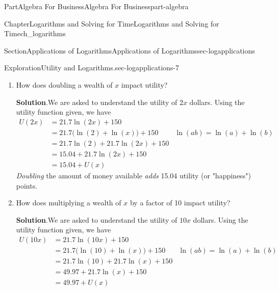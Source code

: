 \documentclass[oneside,10pt,]{tufte-book}
\newcommand{\blocktitlefont}{\relax}
\numberwithin{equation}{chapter}
\newcommand{\amp}{&}
\begin{document}
\begin{partptx}{Part}{Algebra For Business}{}{Algebra For Business}{}{}{part-algebra}
\begin{chapterptx}{Chapter}{Logarithms and Solving for Time}{}{Logarithms and Solving for Time}{}{}{ch_logarithms}
\begin{sectionptx}{Section}{Applications of Logarithms}{}{Applications of Logarithms}{}{}{sec-logapplications}
\begin{exploration}{Exploration}{Utility and Logarithms.}{sec-logapplications-7}
\begin{enumerate}[font=\bfseries,label=(\alph*),ref=\alph*]
\par
Finally, consider the values above \textdollar{}1000.  Note that increasing the balance by a factor of 10 \emph{approximately} increases their happiness by 50 utility points. Often, this is because the individual will start with a list of very clear and very productive uses of the money.  As those clear producive uses are taken care of, the individual needs to look for less clear or less productive uses for their money.  Thus, each dollar does not have the same value to the individual!%
\par
Of course, this is an overly simplified example.  In fact, utility functions are much more complex.  But even these more complex functions will share many of the above properties with our logarithmic utility.%
\item{}How does doubling a wealth of \textdollar{}\(x\) impact utility?%
\par\smallskip%
\noindent\textbf{\blocktitlefont Solution}.\hypertarget{sec-logapplications-7-4-2}{}\quad{}We are asked to understand the utility of \textdollar{}\(2x\) dollars.  Using the utility function given, we have%
\begin{align*}
U(2x) \amp = 21.7\ln(2x) + 150 \amp \\
\amp = 21.7\Big(\ln(2) + \ln(x) \Big) + 150 \amp \ln(ab)=\ln(a)+\ln(b) \\
\amp = 21.7\ln(2) + 21.7\ln(2x) + 150 \amp \\
\amp = 15.04 + 21.7\ln(2x) + 150 \amp \\
\amp = 15.04 + U(x) \amp 
\end{align*}
\emph{Doubling} the amount of money available \emph{adds} 15.04 utility (or "happiness") points.%
\item{}How does multiplying a wealth of \textdollar{}\(x\) by a factor of 10 impact utility?%
\par\smallskip%
\noindent\textbf{\blocktitlefont Solution}.\hypertarget{sec-logapplications-7-5-2}{}\quad{}We are asked to understand the utility of \textdollar{}\(10x\) dollars.  Using the utility function given, we have%
\begin{align*}
U(10x) \amp = 21.7\ln(10x) + 150 \amp \\
\amp = 21.7\Big(\ln(10) + \ln(x) \Big) + 150 \amp \ln(ab)=\ln(a)+\ln(b) \\
\amp = 21.7\ln(10) + 21.7\ln(x) + 150 \amp \\
\amp = 49.97 + 21.7\ln(x) + 150 \amp \\
\amp = 49.97 + U(x) \amp 
\end{align*}

\end{enumerate}
\end{exploration}
\end{sectionptx}
\end{chapterptx}
\end{partptx}
\end{document}
